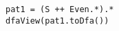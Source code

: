\begin{lstlisting}[style=reclojureScala]
pat1 = (S ++ Even.*).*
dfaView(pat1.toDfa())
\end{lstlisting}
